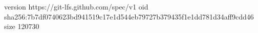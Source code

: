 version https://git-lfs.github.com/spec/v1
oid sha256:7b7df0740623bd941519c17e1d544eb79727b379435f1e1dd781d34aff9cdd46
size 120730
